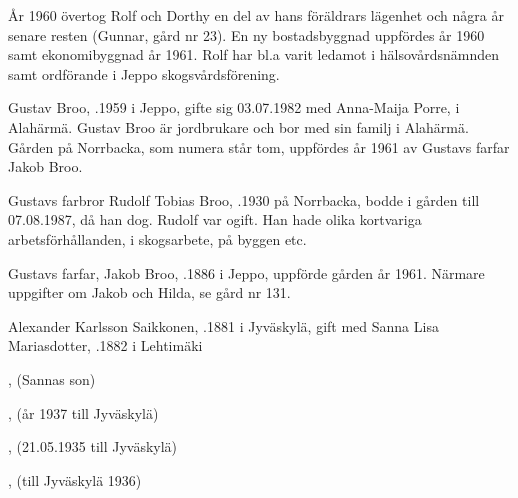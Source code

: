 År 1960 övertog Rolf och Dorthy en del av hans föräldrars lägenhet och några år senare resten (Gunnar, gård nr 23). En ny bostadsbyggnad uppfördes år 1960 samt ekonomibyggnad år 1961. Rolf har bl.a varit ledamot i hälsovårdsnämnden samt ordförande i Jeppo skogsvårdsförening.






Gustav Broo,  .1959 i Jeppo, gifte sig 03.07.1982 med Anna-Maija Porre,  i Alahärmä. Gustav Broo är jordbrukare och bor med sin familj i Alahärmä. Gården på Norrbacka, som numera står tom, uppfördes år 1961 av Gustavs farfar Jakob Broo.
\begin{jhchildren}
  \item {}
  \item {}
  \item {}
  \item {}
\end{jhchildren}


Gustavs farbror Rudolf Tobias Broo, .1930 på Norrbacka, bodde i gården till 07.08.1987, då han dog. Rudolf var ogift. Han hade olika kortvariga arbetsförhållanden, i skogsarbete, på byggen etc.


Gustavs farfar, Jakob Broo, .1886 i Jeppo, uppförde gården år 1961. Närmare uppgifter om Jakob och Hilda, se gård nr 131.




Alexander Karlsson Saikkonen, .1881 i Jyväskylä, gift med Sanna Lisa Mariasdotter, .1882 i Lehtimäki
\begin{jhchildren}
  \item {}, (Sannas son)
  \item {}
  \item {}, (år 1937 till Jyväskylä)
  \item {}
  \item {}
  \item {}, (21.05.1935 till Jyväskylä)
  \item {}, (till Jyväskylä 1936)
\end{jhchildren}

